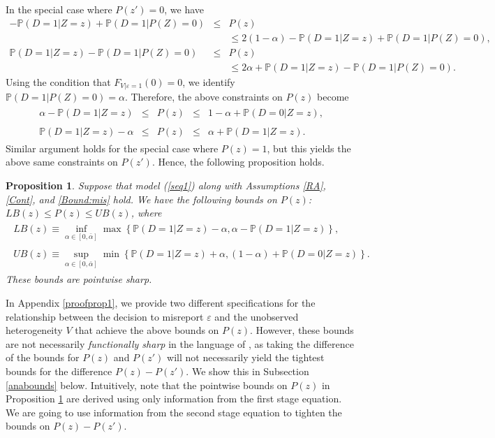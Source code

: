 \documentclass[11pt,reqno]{amsart}
\theoremstyle{plain}
\newtheorem{proposition}{Proposition}
\numberwithin{equation}{section}
\begin{document}
In the special case where $P(z')=0$, we have
\begin{eqnarray*}
-\mathbb P(D=1 \vert Z=z)+\mathbb P(D=1 \vert P(Z)=0) &\leq& P(z)\\
&& \leq 2(1-\alpha)-\mathbb P(D=1 \vert Z=z)+\mathbb P(D=1 \vert P(Z)=0),\\
\mathbb P(D=1 \vert Z=z)-\mathbb P(D=1 \vert P(Z)=0) &\leq& P(z)\\
&& \leq 2 \alpha + \mathbb P(D=1 \vert Z=z)-\mathbb P(D=1 \vert P(Z)=0).
\end{eqnarray*}
Using the condition that $F_{V\vert \varepsilon=1}(0)=0$, we identify $\mathbb P(D=1 \vert P(Z)=0)=\alpha$. Therefore, the above constraints on $P(z)$ become
\begin{eqnarray*}
\begin{array}{lcccl}
\alpha-\mathbb P(D=1 \vert Z=z) &\leq& P(z) &\leq& 1-\alpha+\mathbb P(D=0 \vert Z=z),\\ \\
\mathbb P(D=1 \vert Z=z)-\alpha &\leq& P(z) &\leq&  \alpha + \mathbb P(D=1 \vert Z=z).
\end{array}
\end{eqnarray*}
Similar argument holds for the special case where $P(z)=1$, but this yields the above same constraints on $P(z')$.
Hence, the following proposition holds. 
\begin{proposition}\label{prop1}
Suppose that model (\ref{seq1}) along with Assumptions \ref{RA}, \ref{Cont}, and \ref{Bound:mis} hold. We have the following bounds on $P(z)$: $LB(z) \leq P(z) \leq UB(z)$, where 
\begin{eqnarray*}
\begin{array}{lcccl}
LB(z)\equiv \inf_{\alpha \in [0, \bar{\alpha}]}\max\left\{\mathbb P(D=1\vert Z=z)-\alpha, \alpha-\mathbb P(D=1\vert Z=z)\right\},\\ \\
UB(z)\equiv \sup_{\alpha \in [0, \bar{\alpha}]} \min\left\{\mathbb P(D=1\vert Z=z)+\alpha, (1-\alpha)+\mathbb P(D=0\vert Z=z)\right\}.
\end{array}
\end{eqnarray*}
These bounds are pointwise sharp. 
\end{proposition}
In Appendix \ref{proofprop1}, we provide two different specifications for the relationship between the decision to misreport $\varepsilon$ and the unobserved heterogeneity $V$ that achieve the above bounds on $P(z)$. However, these bounds are not necessarily \textit{functionally sharp} in the language of \cite{Mourifie2020}, as taking the difference of the bounds for $P(z)$ and $P(z')$ will not necessarily yield the tightest bounds for the difference $P(z)-P(z')$. We show this in Subsection \ref{anabounds} below. Intuitively, note that the pointwise bounds on $P(z)$ in Proposition \ref{prop1} are derived using only information from the first stage equation. We are going to use information from the second stage equation to tighten the bounds on $P(z)-P(z')$.  
\end{document}
